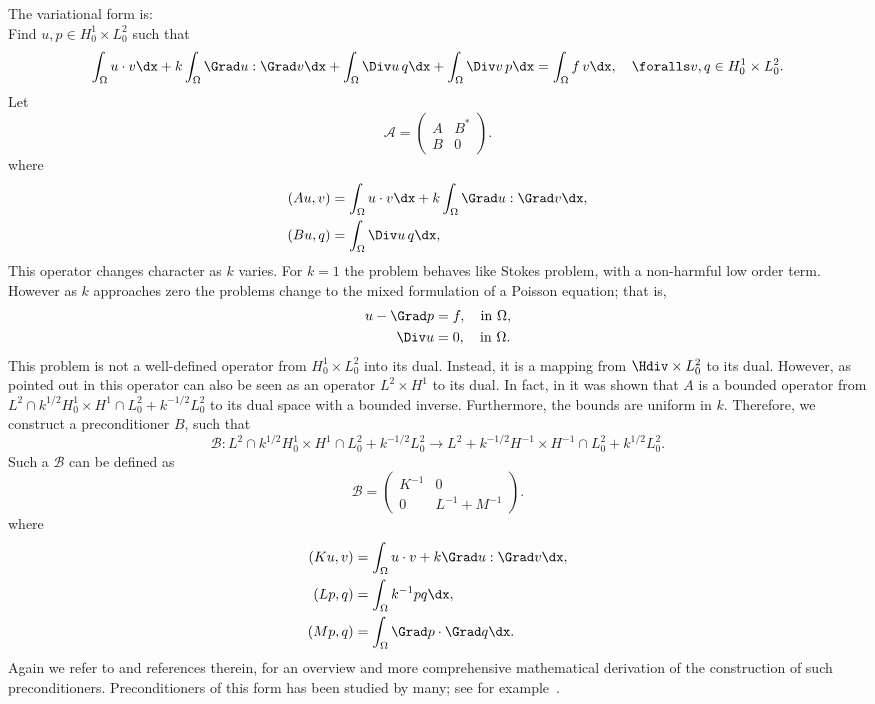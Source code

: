 The variational form is: \\
Find $u,p \in H^1_0 \times L_0^2$ such that
\[
\int_\Omega u \cdot v \dx +
k \int_\Omega \Grad u : \Grad v \dx +
\int_\Omega \Div u \, q \dx +
\int_\Omega \Div v \, p \dx = \int_\Omega f\, v \dx, \quad
\foralls v,q \in H^1_0 \times L_0^2.
\]
Let
\[
\mathcal{A}  =
\begin{pmatrix} A & B^* \\ B & 0 \end{pmatrix}.
\]
where
\begin{align}
  (A u, v) &= \int_\Omega u \cdot v \dx +  k \int_\Omega \Grad u : \Grad v \dx, \\
  (B u, q) &= \int_\Omega \Div u \, q \dx,
\end{align}
This operator changes character as $k$ varies.  For $k=1$ the problem
behaves like Stokes problem, with a non-harmful low order
term. However as $k$ approaches zero the problems change to the mixed
formulation of a Poisson equation; that is,
\begin{align}
  u - \Grad p &= f, \quad \mbox{in} \ \Omega, \\
  \Div u &= 0, \quad \mbox{in} \ \Omega.
\end{align}
This problem is not a well-defined operator from $H^1_0 \times L_0^2$
into its dual. Instead, it is a mapping from $\Hdiv \times L_0^2$ to
its dual.  However, as pointed out in \citet{MardalWinther2004} this
operator can also be seen as an operator $L^2 \times H^1$ to its dual.
In fact, in \citet{MardalTaiWinther2002,MardalWinther2004} it was
shown that $A$ is a bounded operator from $L^2 \cap k^{1/2}
H^1_0 \times H^1 \cap L_0^2 + k^{-1/2} L_0^2$ to its dual space with a
bounded inverse. Furthermore, the bounds are uniform in $k$.
Therefore, we construct a preconditioner $B$, such that
\[
\mathcal{B}: L^2 \cap k^{1/2} H^1_0 \times H^1 \cap L_0^2 + k^{-1/2} L_0^2 \rightarrow
L^2 + k^{-1/2} H^{-1} \times H^{-1} \cap L_0^2 + k^{1/2} L_0^2  .
\]
Such a $\mathcal{B}$ can be defined as
\[
\mathcal{B}
=
\begin{pmatrix} K^{-1} & 0 \\ 0 & L^{-1} + M^{-1} \end{pmatrix}.
\]
where
\begin{align}
  (K u, v) &= \int_\Omega u\cdot v  +  k \Grad u: \Grad v \dx, \\
  (L p, q) &= \int_\Omega k^{-1} p q \dx, \\
  (M p, q) &= \int_\Omega \Grad p \cdot  \Grad q \dx.
\end{align}
Again we refer to \citet{MardalWinther11} and references therein, for
an overview and more comprehensive mathematical derivation of the
construction of such preconditioners.  Preconditioners of this form
has been studied by many; see for
example~\citet{CahouetChabard1988,ElmanSilvesterWathen2005,MardalWinther2004,MardalWinther11,Turek1999}.

